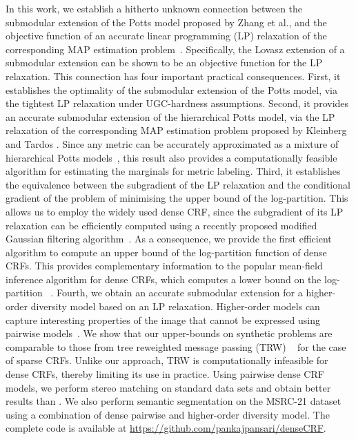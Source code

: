 In this work, we establish a hitherto unknown connection between the submodular
extension of the Potts model proposed by Zhang et al.\citep{zhang2015higher}, and the
objective function of an accurate linear programming (LP) relaxation of the
corresponding MAP estimation problem~\citep{kleinberg2002approximation}. Specifically, the Lovasz extension of a submodular extension can be shown to be an objective function for the LP relaxation. This
connection has four important practical consequences. First, it establishes
the optimality of the submodular extension of the Potts model, via the tightest LP relaxation
under UGC-hardness assumptions. Second, it provides an
accurate submodular extension of the hierarchical Potts model, via the LP
relaxation of the corresponding MAP estimation problem proposed
by Kleinberg and Tardos \citep{kleinberg2002approximation}. Since any metric can be accurately
approximated as a mixture of hierarchical Potts
models~\citep{bartal1996probabilistic, bartal1998approximating}, this result
also provides a computationally feasible algorithm for estimating the marginals
for metric labeling. Third, it establishes the equivalence between the
subgradient of the LP relaxation and the conditional gradient of the problem of
minimising the upper bound of the log-partition. This allows us to employ the
widely used dense CRF, since the subgradient of its LP relaxation can be
efficiently computed using a recently proposed modified Gaussian filtering
algorithm~\citep{ajanthan2017efficient}. As a consequence, we provide the first
efficient algorithm to compute an upper bound of the log-partition function of
dense CRFs. This provides complementary information to the popular mean-field
inference algorithm for dense CRFs, which computes a lower bound on the
log-partition ~\citep{koltun2011efficient}. Fourth, we obtain an accurate 
submodular extension for a higher-order diversity model based on an LP
relaxation. Higher-order models can capture interesting properties of the image that cannot be
expressed using pairwise models~\citep{vineet2014filter, kohli2007p3}. We show that our upper-bounds on synthetic problems are comparable to those from tree reweighted message passing (TRW)
~\citep{wainwright2005new} for the case of sparse CRFs. Unlike our approach,
TRW is computationally infeasible for dense CRFs, thereby limiting its use in
practice. Using pairwise dense CRF models, we perform stereo matching on standard
data sets and obtain better results than \citep{koltun2011efficient}. We also perform semantic segmentation on the MSRC-21 dataset using a combination of dense pairwise and higher-order diversity model. The complete code is available at \url{https://github.com/pankajpansari/denseCRF}.

